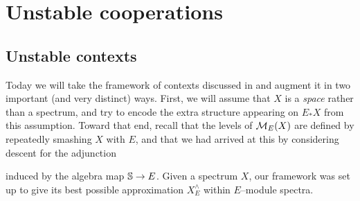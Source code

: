 
\chapter{Unstable cooperations}\label{UnstableCooperationsChapter}





\section{Unstable contexts}\label{UnstableContextsSection}

Today we will take the framework of contexts discussed in  and augment it in two important (and very distinct) ways.  First, we will assume that $X$ is a \emph{space} rather than a spectrum, and try to encode the extra structure appearing on $E_* X$ from this assumption.  Toward that end, recall that the levels of $\context{E}(X)$ are defined by repeatedly smashing $X$ with $E$, and that we had arrived at this by considering descent for the adjunction
\begin{center}
\end{center}
induced by the algebra map $\S \to E$.  Given a spectrum $X$, our framework was set up to give its best possible approximation $X^\wedge_E$ within $E$--module spectra.

